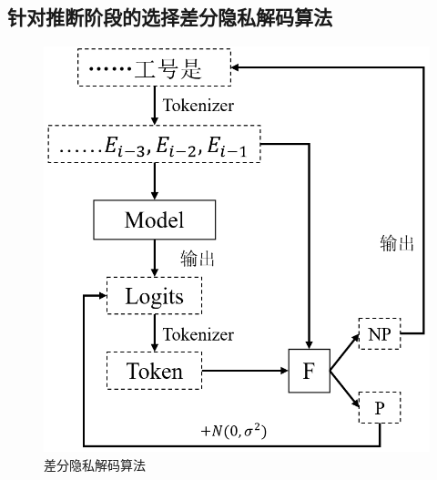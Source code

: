 \subsection{针对推断阶段的选择差分隐私解码算法}


\begin{figure}[h]
	\centering
	\includegraphics[width=0.5\linewidth]{figures/Chap5_PDP_Decode.png}
	\caption{差分隐私解码算法}
	\label{Chap5_PDP_Decode}
\end{figure}



